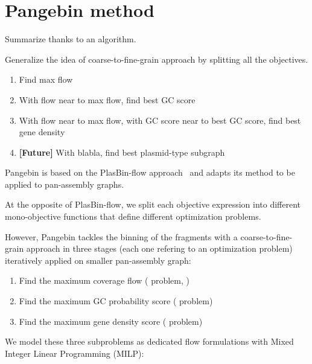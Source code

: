 \section{Pangebin method}

\begin{todobox}
  Summarize thanks to an algorithm.
\end{todobox}

\begin{todobox}
  Generalize the idea of coarse-to-fine-grain approach by splitting all the objectives.

  \begin{enumerate}[label=\roman*.]
    \item Find max flow
    \item With flow near to max flow, find best GC score
    \item With flow near to max flow, with GC score near to best GC score, find best gene density
    \item \textbf{[Future]} With blabla, find best plasmid-type subgraph
  \end{enumerate}
\end{todobox}

Pangebin is based on the PlasBin-flow approach~\cite{manePlasBinflowFlowbasedMILP2023} and adapts its method to be applied to pan-assembly graphs.

\begin{newfeatbox}
  At the opposite of PlasBin-flow, we split each objective expression into different mono-objective functions that define different optimization problems.
\end{newfeatbox}

However, Pangebin tackles the binning of the fragments with a coarse-to-fine-grain approach in three stages (each one refering to an optimization problem) iteratively applied on smaller pan-assembly graph:

\begin{enumerate}[label=\roman*.]
  \item Find the maximum coverage flow (\MCF{} problem, )
  \item Find the maximum GC probability score (\MGC{} problem)
  \item Find the maximum gene density score (\MGD{} problem)
\end{enumerate}

We model these three subproblems as dedicated flow formulations with Mixed Integer Linear Programming (MILP):

